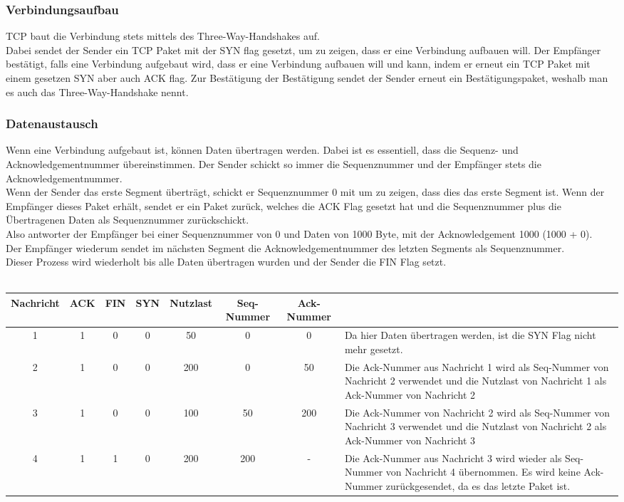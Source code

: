 \documentclass{article}
\begin{document}
	 \subsubsection{Verbindungsaufbau}
	 TCP baut die Verbindung stets mittels des Three-Way-Handshakes auf. \\
	 Dabei sendet der Sender ein TCP Paket mit der SYN flag gesetzt, um zu zeigen, dass er eine Verbindung aufbauen will. Der Empfänger bestätigt, falls eine Verbindung aufgebaut wird, dass er eine Verbindung aufbauen will und kann, indem er erneut ein TCP Paket mit einem gesetzen SYN aber auch ACK flag. Zur Bestätigung der Bestätigung sendet der Sender erneut ein Bestätigungspaket, weshalb man es auch das Three-Way-Handshake nennt. \\
	 \subsubsection{Datenaustausch}
	 Wenn eine Verbindung aufgebaut ist, können Daten übertragen werden. Dabei ist es essentiell, dass die Sequenz- und Acknowledgementnummer übereinstimmen. Der Sender schickt so immer die Sequenznummer und der Empfänger stets die Acknowledgementnummer. \\
	 Wenn der Sender das erste Segment überträgt, schickt er Sequenznummer 0 mit um zu zeigen, dass dies das erste Segment ist. Wenn der Empfänger dieses Paket erhält, sendet er ein Paket zurück, welches die ACK Flag gesetzt hat und die Sequenznummer plus die Übertragenen Daten als Sequenznummer zurückschickt. \\
	 Also antworter der Empfänger bei einer Sequenznummer von 0 und Daten von 1000 Byte, mit der Acknowledgement 1000 (1000 + 0). \\
	 Der Empfänger wiederum sendet im nächsten Segment die Acknowledgementnummer des letzten Segments als Sequenznummer. \\
	 Dieser Prozess wird wiederholt bis alle Daten übertragen wurden und der Sender die FIN Flag setzt. \\ \\
	 \begin{tabularx}{\textwidth}{| c | c | c | c | c | c | c | X |}
	 	\toprule
	 	Nachricht & ACK & FIN & SYN & Nutzlast & Seq-Nummer & Ack-Nummer & \\ \midrule
	 	 1 & 1 & 0 & 0 & 50 & 0 & 0 & Da hier Daten übertragen werden, ist die SYN Flag nicht mehr gesetzt. \\ \hline
	 	2 & 1 & 0 & 0 & 200 & 0 & 50 & Die Ack-Nummer aus Nachricht 1 wird als Seq-Nummer von Nachricht 2 verwendet und die Nutzlast von Nachricht 1 als Ack-Nummer von Nachricht 2 \\ \hline
	 	3 & 1 & 0 & 0 & 100 & 50 & 200 & Die Ack-Nummer von Nachricht 2 wird als Seq-Nummer von Nachricht 3 verwendet und die Nutzlast von Nachricht 2 als Ack-Nummer von Nachricht 3 \\ \hline
	 	4 & 1 & 1 & 0 & 200 & 200 & - & Die Ack-Nummer aus Nachricht 3 wird wieder als Seq-Nummer von Nachricht 4 übernommen. Es wird keine Ack-Nummer zurückgesendet, da es das letzte Paket ist. \\
	 	\bottomrule
	 \end{tabularx} \\
\end{document}
